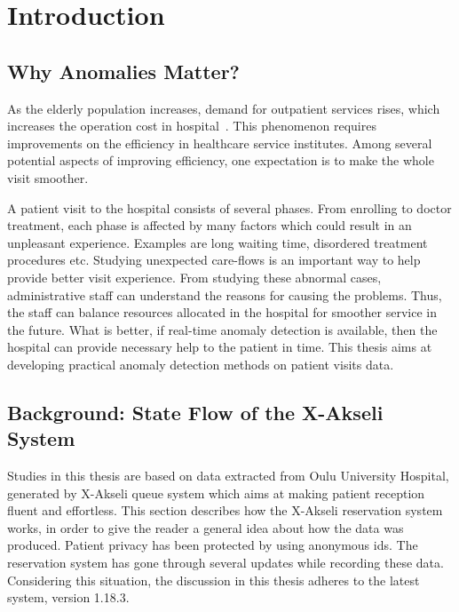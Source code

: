 \chapter{Introduction}
\label{chapter:intro}
\section{Why Anomalies Matter?}
As the elderly population increases, demand for outpatient services rises, which increases the operation cost in hospital~\cite{gupta2008appointment}\cite{hulshof2012taxonomic}. This phenomenon requires improvements on the efficiency in healthcare service institutes. Among several potential aspects of improving efficiency, one expectation is to make the whole visit smoother. 

A patient visit to the hospital consists of several phases. From enrolling to doctor treatment, each phase is affected by many factors which could result in an unpleasant experience. Examples are long waiting time, disordered treatment procedures etc. Studying unexpected care-flows is an important way to help provide better visit experience. From studying these abnormal cases, administrative staff can understand the reasons for causing the problems. Thus, the staff can balance resources allocated in the hospital for smoother service in the future. What is better, if real-time anomaly detection is available, then the hospital can provide necessary help to the patient in time. This thesis aims at developing practical anomaly detection methods on patient visits data.

\section{Background: State Flow of the X-Akseli System}
Studies in this thesis are based on data extracted from Oulu University Hospital, generated by X-Akseli queue system which aims at making patient reception fluent and effortless. This section describes how the X-Akseli reservation system works, in order to give the reader a general idea about how the data was produced. Patient privacy has been protected by using anonymous ids. The reservation system has gone through several updates while recording these data. Considering this situation, the discussion in this thesis adheres to the latest system, version 1.18.3.

